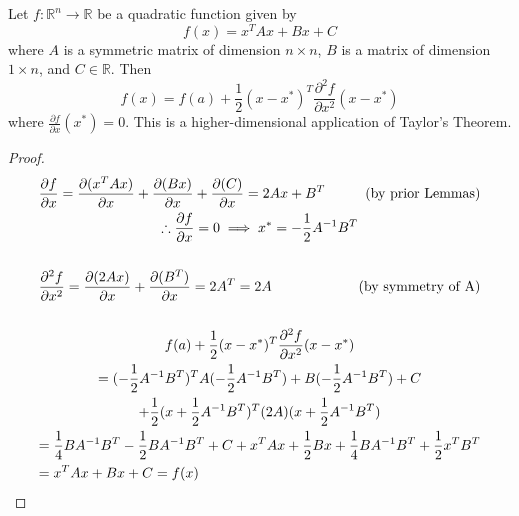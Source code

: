 \begin{lemma} \label{lemmaTaylorDecomp}
Let \(f: \mathbb{R}^n \to \mathbb{R}\) be a quadratic function given by \[f(x) = x^T Ax + Bx + C\]
where \(A\) is a symmetric matrix of dimension \(n \times n\), \(B\) is a matrix of dimension \(1 \times n\), and \(C \in \mathbb{R}\). Then \[
f(x) = f(a) + \frac{1}{2} (x-x^*)^T \frac{\partial^2 f}{\partial x^2} (x-x^*)
\] where \(\frac{\partial f}{\partial x}(x^*) = 0\). This is a higher-dimensional application of Taylor's Theorem.

\end{lemma}
\begin{proof}
\begin{multline*}
\frac{\partial f}{\partial x} = \frac{\partial (x^T A x)}{\partial x} + \frac{\partial (B x)}{\partial x} + \frac{\partial (C)}{\partial x} = 2Ax + B^T \hfill \text{(by prior Lemmas)} \\
\therefore \frac{\partial f}{\partial x} = 0 \implies x^* = -\frac{1}{2} A^{-1} B^T \\ \\
\frac{\partial^2 f}{\partial x^2} = \frac{\partial (2Ax)}{\partial x} + \frac{\partial (B^T)}{\partial x} = 2A^T = 2A \hfill \text{(by symmetry of A)} \\ \\
f(a) + \frac{1}{2} (x-x^*)^T \frac{\partial^2 f}{\partial x^2} (x-x^*) \\
= (-\frac{1}{2}A^{-1}B^T)^T A (-\frac{1}{2}A^{-1}B^T) + B(-\frac{1}{2}A^{-1}B^T) + C \\
+ \frac{1}{2}(x +\frac{1}{2}A^{-1}B^T)^T (2A) (x +\frac{1}{2}A^{-1}B^T) \\
= \frac{1}{4} B A^{-1} B^T - \frac{1}{2} B A^{-1} B^T + C + x^T A x + \frac{1}{2}Bx + \frac{1}{4} BA^{-1}B^T + \frac{1}{2}x^TB^T \\
= x^TAx + Bx + C = f(x) \hfill
\end{multline*}
\end{proof}

